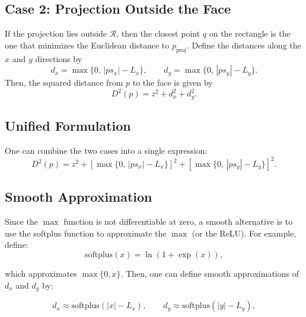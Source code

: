 \documentclass[11pt]{article}
\begin{document}
    \subsection*{Case 2: Projection Outside the Face}

        If the projection lies outside \(\mathcal{R}\), then the closest point \(q\) on the rectangle is the one that minimizes the Euclidean distance to \(p_{\text{proj}}\). Define the distances along the \(x\) and \(y\) directions by
        \begin{equation}
            d_x = \max\{0,\, |ps_x| - L_x\}, \qquad
            d_y = \max\{0,\, |ps_y| - L_y\}.
        \end{equation}
        Then, the squared distance from \(p\) to the face is given by
        \begin{equation}
            D^2(p) = z^2 + d_x^2 + d_y^2.
        \end{equation}

    \subsection*{Unified Formulation}

        One can combine the two cases into a single expression:
        \begin{equation}
            D^2(p) = z^2 + \left[ \max\{0,\, |ps_x| - L_x\} \right]^2 + \left[ \max\{0,\, |ps_y| - L_y\} \right]^2.
        \end{equation}

    \subsection*{Smooth Approximation}

        Since the \(\max\) function is not differentiable at zero, a smooth alternative is to use the softplus function to approximate the \(\max\) (or the ReLU). For example, define:
        \begin{equation}
            \text{softplus}(x) = \ln\left(1+\exp(x)\right),
        \end{equation}

        which approximates \(\max\{0,x\}\). Then, one can define smooth approximations of \(d_x\) and \(d_y\) by:

        \begin{equation}
            d_x \approx \text{softplus}(|x| - L_x), \qquad
            d_y \approx \text{softplus}(|y| - L_y),
        \end{equation}
\end{document}
